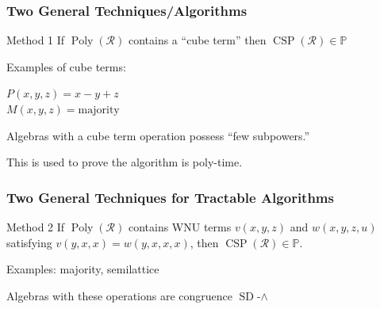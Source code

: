 \documentclass[10pt,xcolor=dvipsnames%
   ]{beamer}
\DeclareMathOperator{\SD}{SD}
\DeclareMathOperator{\CSP}{CSP}
\DeclareMathOperator{\Poly}{Poly}
\renewcommand{\.}{\cdot}
\newcommand{\sR}{\ensuremath{\mathcal{R}}}
\newcommand{\NP}{\ensuremath{\mathbb{NP}}\xspace}
\renewcommand{\P}{\ensuremath{\mathbb{P}}\xspace}
\begin{document}

\begin{frame}
\frametitle{Two General Techniques/Algorithms}
\begin{exampleblock}{Method 1}
If $\Poly(\sR)$ contains a ``cube term'' then $\CSP(\sR)\in \P$
\end{exampleblock}

\pause
Examples of cube terms:

$P(x,y,z) = x-y+z$\\
$M(x,y,z) = \text{majority}$

Algebras with a cube term operation possess ``few subpowers.''

This is used to prove the algorithm is poly-time.

\end{frame}

\begin{frame}
  \frametitle{Two General Techniques for Tractable Algorithms}
\begin{exampleblock}{Method 2}
  If $\Poly(\sR)$ contains WNU terms $v(x,y,z)$ and $w(x,y,z,u)$
  satisfying $v(y,x,x)= w(y,x,x,x)$, then $\CSP(\sR)\in \P$.
\end{exampleblock}

\pause
Examples: majority, semilattice 

Algebras with these operations are congruence $\SD$-$\wedge$

\end{frame}
\end{document}
